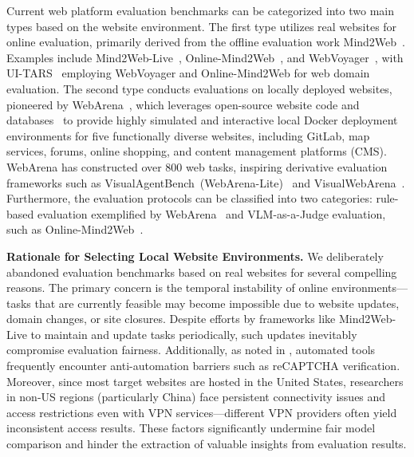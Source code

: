 Current web platform evaluation benchmarks can be categorized into two main types based on the website environment. The first type utilizes real websites for online evaluation, primarily derived from the offline evaluation work Mind2Web~\citep{deng2023mind2web}. Examples include Mind2Web-Live~\citep{pan2024webcanvas}, Online-Mind2Web~\citep{xue2025illusion}, and WebVoyager~\citep{he2024webvoyager}, with UI-TARS~\citep{qin2025uitars} employing WebVoyager and Online-Mind2Web for web domain evaluation. The second type conducts evaluations on locally deployed websites, pioneered by WebArena~\citep{zhou2023webarena}, which leverages open-source website code and databases~\citep{sun2024code} to provide highly simulated and interactive local Docker deployment environments for five functionally diverse websites, including GitLab, map services, forums, online shopping, and content management platforms (CMS). WebArena has constructed over 800 web tasks, inspiring derivative evaluation frameworks such as VisualAgentBench~(WebArena-Lite)~\citep{liu2024visualagentbench}
and VisualWebArena~\citep{koh2024visualwebarena}. 
% 
Furthermore, the evaluation protocols can be classified into two categories: rule-based evaluation exemplified by WebArena~\citep{zhou2023webarena} and VLM-as-a-Judge evaluation, such as Online-Mind2Web~\citep{xue2025illusion}.

\textbf{Rationale for Selecting Local Website Environments.}
We deliberately abandoned evaluation benchmarks based on real websites for several compelling reasons. The primary concern is the temporal instability of online environments—tasks that are currently feasible may become impossible due to website updates, domain changes, or site closures. Despite efforts by frameworks like Mind2Web-Live to maintain and update tasks periodically, such updates inevitably compromise evaluation fairness. Additionally, as noted in \citep{xu2024aguvis}, automated tools frequently encounter anti-automation barriers such as reCAPTCHA verification. Moreover, since most target websites are hosted in the United States, researchers in non-US regions (particularly China) face persistent connectivity issues and access restrictions even with VPN services—different VPN providers often yield inconsistent access results. These factors significantly undermine fair model comparison and hinder the extraction of valuable insights from evaluation results.

